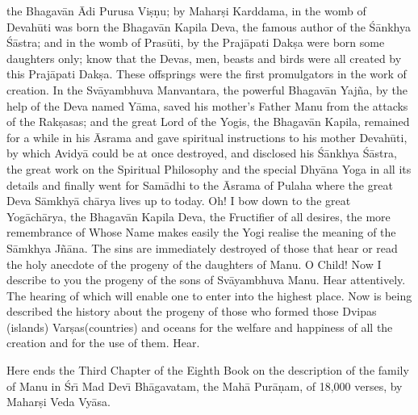 the Bhagav\=an \=Adi Purusa Vi\d{s}\d{n}u; by Mahar\d{s}i Karddama, in the womb of Devah\=uti was born the Bhagav\=an Kapila Deva, the famous author of the \'S\=ankhya \'S\=astra; and in the womb of Pras\=uti, by the Praj\=apati Dak\d{s}a were born some daughters only; know that the Devas, men, beasts and birds were all created by this Praj\=apati Dak\d{s}a. These offsprings were the first promulgators in the work of creation. In the Sv\=ayambhuva Manvantara, the powerful Bhagav\=an Yaj\~na, by the help of the Deva named Y\=ama, saved his mother's Father Manu from the attacks of the Rak\d{s}asas; and the great Lord of the Yogis, the Bhagav\=an Kapila, remained for a while in his \=Asrama and gave spiritual instructions to his mother Devah\=uti, by which Avidy\=a could be at once destroyed, and disclosed his \'S\=ankhya \'S\=astra, the great work on the Spiritual Philosophy and the special Dhy\=ana Yoga in all its details and finally went for Sam\=adhi to the \=Asrama of Pulaha where the great Deva S\=amkhy\=a ch\=arya lives up to today. Oh! I bow down to the great Yog\=ach\=arya, the Bhagav\=an Kapila Deva, the Fructifier of all desires, the more remembrance of Whose Name makes easily the Yogi realise the meaning of the S\=amkhya J\~n\=ana. The sins are immediately destroyed of those that hear or read the holy anecdote of the progeny of the daughters of Manu. O Child! Now I describe to you the progeny of the sons of Sv\=ayambhuva Manu. Hear attentively. The hearing of which will enable one to enter into the highest place. Now is being described the history about the progeny of those who formed those Dvipas (islands) Var\d{s}as(countries) and oceans for the welfare and happiness of all the creation and for the use of them. Hear.

Here ends the Third Chapter of the Eighth Book on the description of the family of Manu in \'Sr\={\i} Mad Dev\={\i} Bh\=agavatam, the Mah\=a Pur\=a\d{n}am, of 18,000 verses, by Mahar\d{s}i Veda Vy\=asa.



